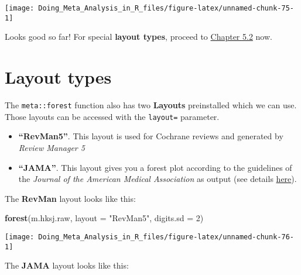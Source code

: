 \documentclass[]{book}
\newenvironment{Shaded}{\begin{snugshade}}{\end{snugshade}}
\newcommand{\KeywordTok}[1]{\textcolor[rgb]{0.13,0.29,0.53}{\textbf{#1}}}
\newcommand{\DataTypeTok}[1]{\textcolor[rgb]{0.13,0.29,0.53}{#1}}
\newcommand{\DecValTok}[1]{\textcolor[rgb]{0.00,0.00,0.81}{#1}}
\newcommand{\StringTok}[1]{\textcolor[rgb]{0.31,0.60,0.02}{#1}}
\newcommand{\NormalTok}[1]{#1}
\providecommand{\tightlist}{%
  \setlength{\itemsep}{0pt}\setlength{\parskip}{0pt}}
\theoremstyle{definition}
\theoremstyle{definition}
\theoremstyle{definition}
\theoremstyle{remark}
\begin{document}
\begin{center}\texttt{[image: Doing\_Meta\_Analysis\_in\_R\_files/figure-latex/unnamed-chunk-75-1]} \end{center}

Looks good so far! For special \textbf{layout types}, proceed to
\protect\hyperlink{layouttypes}{Chapter 5.2} now.

\hypertarget{layouttypes}{\section{Layout types}\label{layouttypes}}

The \texttt{meta::forest} function also has two \textbf{Layouts}
preinstalled which we can use. Those layouts can be accessed with the
\texttt{layout=} parameter.

\begin{itemize}
\tightlist
\item
  \textbf{``RevMan5''}. This layout is used for Cochrane reviews and
  generated by \emph{Review Manager 5}
\item
  \textbf{``JAMA''}. This layout gives you a forest plot according to
  the guidelines of the \emph{Journal of the American Medical
  Association} as output (see details
  \href{https://jamanetwork.com/journals/jama/pages/instructions-for-authors}{here}).
\end{itemize}

The \textbf{RevMan} layout looks like this:

\begin{Shaded}
\begin{Highlighting}[]
\KeywordTok{forest}\NormalTok{(m.hksj.raw,}
       \DataTypeTok{layout =} \StringTok{"RevMan5"}\NormalTok{,}
       \DataTypeTok{digits.sd =} \DecValTok{2}\NormalTok{)}
\end{Highlighting}
\end{Shaded}

\begin{center}\texttt{[image: Doing\_Meta\_Analysis\_in\_R\_files/figure-latex/unnamed-chunk-76-1]} \end{center}

The \textbf{JAMA} layout looks like this:

\begin{Shaded}
\end{Shaded}
\end{document}
